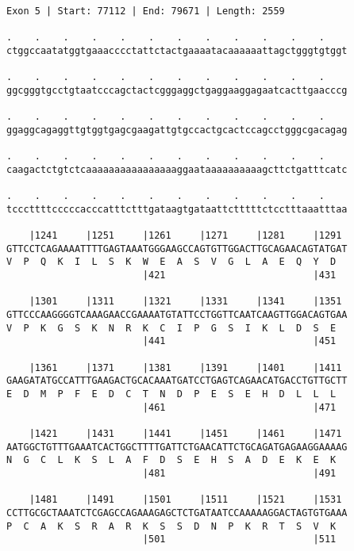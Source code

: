 \documentclass{article}
\begin{document}
\newpage
\begin{Verbatim}[fontfamily=courier]
Exon 5 | Start: 77112 | End: 79671 | Length: 2559

.    .    .    .    .    .    .    .    .    .    .    .    
ctggccaatatggtgaaacccctattctactgaaaatacaaaaaattagctgggtgtggt

.    .    .    .    .    .    .    .    .    .    .    .    
ggcgggtgcctgtaatcccagctactcgggaggctgaggaaggagaatcacttgaacccg

.    .    .    .    .    .    .    .    .    .    .    .    
ggaggcagaggttgtggtgagcgaagattgtgccactgcactccagcctgggcgacagag

.    .    .    .    .    .    .    .    .    .    .    .    
caagactctgtctcaaaaaaaaaaaaaaaaggaataaaaaaaaaagcttctgatttcatc

.    .    .    .    .    .    .    .    .    .    .    .    
tcccttttcccccacccatttctttgataagtgataattctttttctcctttaaatttaa

    |1241     |1251     |1261     |1271     |1281     |1291 
GTTCCTCAGAAAATTTTGAGTAAATGGGAAGCCAGTGTTGGACTTGCAGAACAGTATGAT
V  P  Q  K  I  L  S  K  W  E  A  S  V  G  L  A  E  Q  Y  D  
                        |421                          |431  

    |1301     |1311     |1321     |1331     |1341     |1351 
GTTCCCAAGGGGTCAAAGAACCGAAAATGTATTCCTGGTTCAATCAAGTTGGACAGTGAA
V  P  K  G  S  K  N  R  K  C  I  P  G  S  I  K  L  D  S  E  
                        |441                          |451  

    |1361     |1371     |1381     |1391     |1401     |1411 
GAAGATATGCCATTTGAAGACTGCACAAATGATCCTGAGTCAGAACATGACCTGTTGCTT
E  D  M  P  F  E  D  C  T  N  D  P  E  S  E  H  D  L  L  L  
                        |461                          |471  

    |1421     |1431     |1441     |1451     |1461     |1471 
AATGGCTGTTTGAAATCACTGGCTTTTGATTCTGAACATTCTGCAGATGAGAAGGAAAAG
N  G  C  L  K  S  L  A  F  D  S  E  H  S  A  D  E  K  E  K  
                        |481                          |491  

    |1481     |1491     |1501     |1511     |1521     |1531 
CCTTGCGCTAAATCTCGAGCCAGAAAGAGCTCTGATAATCCAAAAAGGACTAGTGTGAAA
P  C  A  K  S  R  A  R  K  S  S  D  N  P  K  R  T  S  V  K  
                        |501                          |511  

\end{Verbatim}
\newpage
\end{document}
